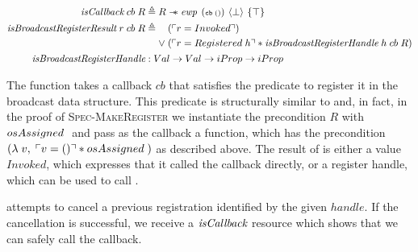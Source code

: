 \begin{align*}
    \gsIsCb{}\; cb\; R                            & \triangleq R \wand \ewp{cb\; ()}{\bot}{\top}                                                                    \\
    \emph{isBroadcastRegisterResult}\; r\; cb\; R & \triangleq \begin{aligned}[t]
                                                                          & (\ulcorner r = Invoked \urcorner)                                                           \\
                                                                   \vee\; & (\ulcorner r = Registered\; h \urcorner \ast \emph{isBroadcastRegisterHandle}\; h\; cb\; R)
                                                               \end{aligned} \\
    \emph{isBroadcastRegisterHandle}              & : Val \to Val \to iProp \to iProp
\end{align*}


The function  takes a callback \(cb\) that satisfies the \gsIsCb{} predicate to register it in the broadcast data structure.
This predicate is structurally similar to \gsIsWaker{} and, in fact, in the proof of \textsc{Spec-MakeRegister} we instantiate the precondition \(R\) with \(osAssigned\;\) and pass as the callback a  function, which has the precondition \((\lambda\; v,\; \ulcorner v = () \urcorner \ast osAssigned\;)\) as described above.
The result of  is either a value \(Invoked\), which expresses that it called the callback directly, or a register handle, which can be used to call .

 attempts to cancel a previous registration identified by the given \(handle\).
If the cancellation is successful, we receive a \(\emph{isCallback}{}\) resource which shows that we can safely call the callback.

